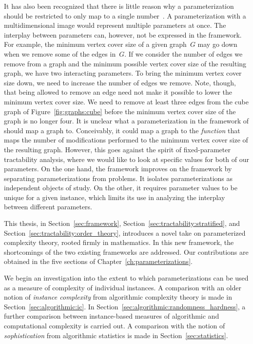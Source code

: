 It has also been recognized that there is little reason why a parameterization should be restricted to only map to a single number~\parencite{fellows2013towards,niedermeier2010reflections}.
A parameterization with a multidimensional image would represent multiple parameters at once.
The interplay between parameters can, however, not be expressed in the \citeauthor{flum2006parameterized} framework.
For example, the minimum vertex cover size of a given graph~$G$ may go down when we remove some of the edges in~$G$.
If we consider the number of edges we remove from a graph and the minimum possible vertex cover size of the resulting graph, we have two interacting parameters.
To bring the minimum vertex cover size down, we need to increase the number of edges we remove.
Note, though, that being allowed to remove an edge need not make it possible to lower the minimum vertex cover size.
We need to remove at least three edges from the cube graph of Figure~\ref{fig:graphs:cube} before the minimum vertex cover size of the graph is no longer four.
It is unclear what a parameterization in the framework of \citeauthor{flum2006parameterized} should map a graph to.
Conceivably, it could map a graph to the \emph{function} that maps the number of modifications performed to the minimum vertex cover size of the resulting graph.
However, this goes against the spirit of fixed-parameter tractability analysis, where we would like to look at specific values for both of our parameters.
On the one hand, the \citeauthor{flum2006parameterized} framework improves on the \citeauthor{downey1999parameterized} framework by separating parameterizations from problems.
It isolates parameterizations as independent objects of study.
On the other, it requires parameter values to be unique for a given instance, which limits its use in analyzing the interplay between different parameters.


\label{sec:contributions}%

This thesis, in Section~\ref{sec:framework}, Section~\ref{sec:tractability:stratified}, and Section~\ref{sec:tractability:order_theory}, introduces a novel take on parameterized complexity theory, rooted firmly in mathematics.
In this new framework, the shortcomings of the two existing frameworks are addressed.
Our contributions are obtained in the five sections of Chapter~\ref{ch:parameterizations}.

We begin an investigation into the extent to which parameterizations can be used as a measure of complexity of individual instances.
A comparison with an older notion of \emph{instance complexity} from algorithmic complexity theory is made in Section~\ref{sec:algorithmic:ic}.
In Section~\ref{sec:algorithmic:randomness_hardness}, a further comparison between instance-based measures of algorithmic and computational complexity is carried out.
A comparison with the notion of \emph{sophistication} from algorithmic statistics is made in Section~\ref{sec:statistics}.

